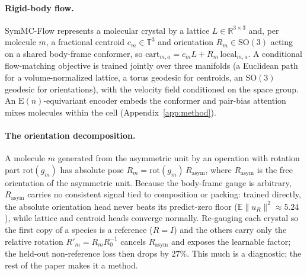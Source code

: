 \documentclass[10pt]{article}
\begin{document}
\paragraph{Rigid-body flow.}
SymMC-Flow represents a molecular crystal by a lattice
$L\in\mathbb{R}^{3\times3}$ and, per molecule $m$, a fractional centroid
$c_m\in\mathbb{T}^3$ and orientation $R_m\in\mathrm{SO}(3)$ acting on a shared
body-frame conformer, so
$\text{cart}_{m,a}=c_mL+R_m\,\text{local}_{m,a}$. A conditional flow-matching
objective\cite{lipman2023flowmatching} is trained jointly over three manifolds
(a Euclidean path for a volume-normalized lattice, a torus geodesic for
centroids, an $\mathrm{SO}(3)$ geodesic for orientations), with the velocity
field conditioned on the space group. An $\mathrm{E}(n)$-equivariant
encoder\cite{satorras2021egnn} embeds the conformer and pair-bias attention mixes
molecules within the cell (Appendix~\ref{app:method}).

\paragraph{The orientation decomposition.}
A molecule $m$ generated from the asymmetric unit by an operation with rotation
part $\mathrm{rot}(g_m)$ has absolute pose
$R_m=\mathrm{rot}(g_m)\,R_{\text{asym}}$, where $R_{\text{asym}}$ is the free
orientation of the asymmetric unit. Because the body-frame gauge is arbitrary,
$R_{\text{asym}}$ carries no consistent signal tied to composition or packing:
trained directly, the absolute orientation head never beats its predict-zero
floor ($\mathbb{E}\lVert u_R\rVert^2\!\approx\!5.24$), while lattice and centroid
heads converge normally. Re-gauging each crystal so the first copy of a species
is a reference ($R{=}I$) and the others carry only the relative rotation
$R'_m=R_mR_0^{-1}$ cancels $R_{\text{asym}}$ and exposes the learnable factor;
the held-out non-reference loss then drops by $27\%$. This much is a diagnostic;
the rest of the paper makes it a method.
\end{document}

